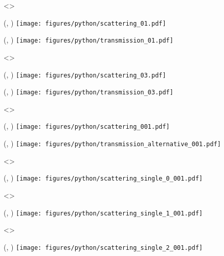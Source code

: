 \visible<\SLIDERESOLUTIONTHREE>{
    \begin{textblock}{\SPECTRUMWIDTH}(\SCASPECTRUMX, \SPECTRUMY)
        \texttt{[image: figures/python/scattering\_01.pdf]}
    \end{textblock}

    \begin{textblock}{\SPECTRUMWIDTH}(\TRASPECTRUMX, \SPECTRUMY)
        \texttt{[image: figures/python/transmission\_01.pdf]}
    \end{textblock}
}

\visible<\SLIDERESOLUTIONFOUR>{
    \begin{textblock}{\SPECTRUMWIDTH}(\SCASPECTRUMX, \SPECTRUMY)
        \texttt{[image: figures/python/scattering\_03.pdf]}
    \end{textblock}

    \begin{textblock}{\SPECTRUMWIDTH}(\TRASPECTRUMX, \SPECTRUMY)
        \texttt{[image: figures/python/transmission\_03.pdf]}
    \end{textblock}
}

\visible<\SLIDEALTERNATIVE>{
    \begin{textblock}{\SPECTRUMWIDTH}(\SCASPECTRUMX, \SPECTRUMY)
        \texttt{[image: figures/python/scattering\_001.pdf]}
    \end{textblock}

    \begin{textblock}{\SPECTRUMWIDTH}(\TRASPECTRUMX, \SPECTRUMY)
        \texttt{[image: figures/python/transmission\_alternative\_001.pdf]}
    \end{textblock}
}

\visible<\SLIDELASERRED>{
    \begin{textblock}{\SPECTRUMWIDTH}(\SCASPECTRUMX, \SPECTRUMY)
        \texttt{[image: figures/python/scattering\_single\_0\_001.pdf]}
    \end{textblock}    
}

\visible<\SLIDELASERORANGE>{
    \begin{textblock}{\SPECTRUMWIDTH}(\SCASPECTRUMX, \SPECTRUMY)
        \texttt{[image: figures/python/scattering\_single\_1\_001.pdf]}
    \end{textblock}    
}

\visible<\SLIDELASERGREEN>{
    \begin{textblock}{\SPECTRUMWIDTH}(\SCASPECTRUMX, \SPECTRUMY)
        \texttt{[image: figures/python/scattering\_single\_2\_001.pdf]}
    \end{textblock}    
}